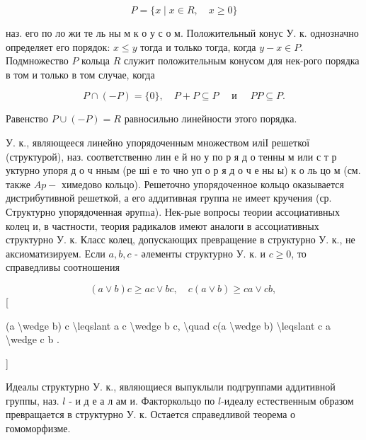 \documentclass[10pt]{article}
\begin{document}
\[

P=\{x \mid x \in R, \quad x \geqslant 0\}

\]



наз. его по ло жи те ль ны м к о у с о м. Положительный конус У. к. однозначно определяет его порядок: $x \leqslant y$ тогда и только тогда, когда $y-x \in P$. Подмножество $P$ кольца $R$ служит положительным конусом для нек-рого порядка в том и только в том случае, когда



\[

P \cap(-P)=\{0\}, \quad P+P \subseteq P \quad \text { и } \quad P P \subseteq P .

\]



Равенство $P \cup(-P)=R$ равносильно линейности этого порядка.



У. к., являющееся линейно упорядоченным множеством иліІ решеткої (структурой), наз. соответственно лин е й но у по р я д о тенны м или с т р уктурно упоря д о ч нным (ре ші е то чно уп о р я д о ч е ны ы) к о ль цо м (см. также $A p-$ химедово кольцо). Решеточно упорядоченное кольцо оказывается дистрибутивной решеткой, а его аддитивная группа не имеет кручения (ср. Структурно упорядоченная әрупnа). Нек-рые вопросы теории ассоциативных колец и, в частности, теория радикалов имеют аналоги в ассоциативных структурно У. к. Класс колец, допускающих превращение в структурно У. к., не аксиоматизируем. Если $a, b, c$ - әлементы структурно У. к. и $c \geqslant 0$, то справедливы соотношения



\[

(a \vee b) c \geqslant a c \vee b c, \quad c(a \vee b) \geqslant c a \vee c b \text {, }

\][



(a \textbackslash wedge b) c \textbackslash leqslant a c \textbackslash wedge b c, \textbackslash quad c(a \textbackslash wedge b) \textbackslash leqslant c a \textbackslash wedge c b .

]



Идеалы структурно У. к., являющиеся выпуклыли подгруппами аддитивной группы, наз. $l$ - и д е а л ам и. Факторкольцо по $l$-идеалу естественным образом превращается в структурно У. к. Остается справедливой теорема о гомоморфизме.
\end{document}
